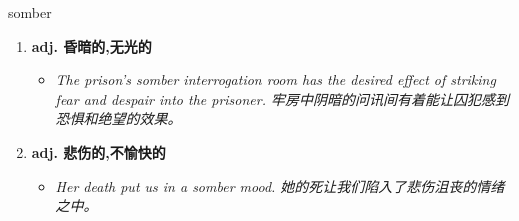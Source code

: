 
\begin{frame}
{\huge somber}
\begin{center}
\begin{enumerate}\Large
  \item \textbf{adj. 昏暗的,无光的}
  \begin{itemize}
    \item \em{\Large{The prison's somber interrogation room has the desired effect of striking fear and despair into the prisoner. 牢房中阴暗的问讯间有着能让囚犯感到恐惧和绝望的效果。}}
  \end{itemize}
  \item \textbf{adj. 悲伤的,不愉快的}
  \begin{itemize}
    \item \em{\Large{Her death put us in a somber mood. 她的死让我们陷入了悲伤沮丧的情绪之中。}}
  \end{itemize}
\end{enumerate}
\end{center}
\end{frame}
